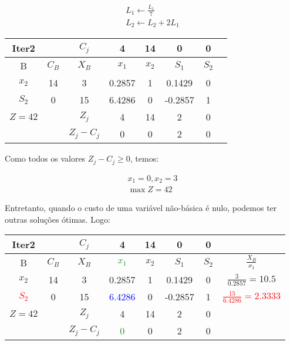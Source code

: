\documentclass[]{article}
\begin{document}
\begin{align*}
    L_1 \leftarrow \frac{L_1}{7} \\
    L_2 \leftarrow L_2 + 2L_1
\end{align*}

\begin{center}
 \begin{tabular}{| c | c | c | c | c | c | c | c |} 
 \hline
 Iter2 &   & $C_j$ & 4 & 14 & 0 & 0 &  \\ [0.5ex] 
 \hline
 B & $C_B$ & $X_B$ & $x_1$ & $x_2$ & $S_1$ & $S_2$ &  \\ 
 \hline
 $x_2$ & 14 & 3 & 0.2857 & 1 & 0.1429 & 0 &  \\
 \hline
 $S_2$ & 0 & 15 & 6.4286 & 0 & -0.2857 & 1 &  \\
 \hline
 $Z=42$ &   & $Z_j$ & 4 & 14 & 2 & 0 &   \\
 \hline
  &   & $Z_j - C_j$ & 0 & 0 & 2 & 0 &  \\
 \hline
\end{tabular}
\end{center}

Como todos os valores $Z_j - C_j \geq 0$, temos:

\begin{align*}
    x_1=0, x_2=3 \\
    \max Z = 42
\end{align*}

Entretanto, quando o custo de uma variável não-básica é nulo, podemos ter outras soluções ótimas. Logo:

\begin{center}
 \begin{tabular}{| c | c | c | c | c | c | c | c |} 
 \hline
 Iter2 &   & $C_j$ & 4 & 14 & 0 & 0 &  \\ [0.5ex] 
 \hline
 B & $C_B$ & $X_B$ & \textcolor{ForestGreen}{$x_1$} & $x_2$ & $S_1$ & $S_2$ & $\frac{X_B}{x_1}$ \\ 
 \hline
 $x_2$ & 14 & 3 & 0.2857 & 1 & 0.1429 & 0 & $\frac{3}{0.2857}=10.5$ \\
 \hline
 \textcolor{red}{$S_2$} & 0 & 15 & \textcolor{blue}{6.4286} & 0 & -0.2857 & 1 & \textcolor{red}{$\frac{15}{6.4286}=2.3333$} \\
 \hline
 $Z=42$ &   & $Z_j$ & 4 & 14 & 2 & 0 &   \\
 \hline
  &   & $Z_j - C_j$ & \textcolor{ForestGreen}{0} & 0 & 2 & 0 &  \\
 \hline
\end{tabular}
\end{center}
\end{document}

